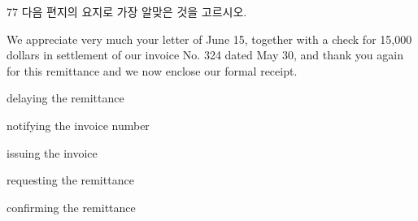 \begin{question}{77}
다음 편지의 요지로 가장 알맞은 것을 고르시오.
\begin{framedtext}
We appreciate very much your letter of June 15, together with a check for 15,000 dollars in settlement of our invoice No. 324 dated May 30, and thank you again for this remittance and we now enclose our formal receipt.
\end{framedtext}
\begin{choices}
  \item delaying the remittance
  \item notifying the invoice number
  \item issuing the invoice
  \item requesting the remittance
  \item confirming the remittance
\end{choices}
\end{question}

